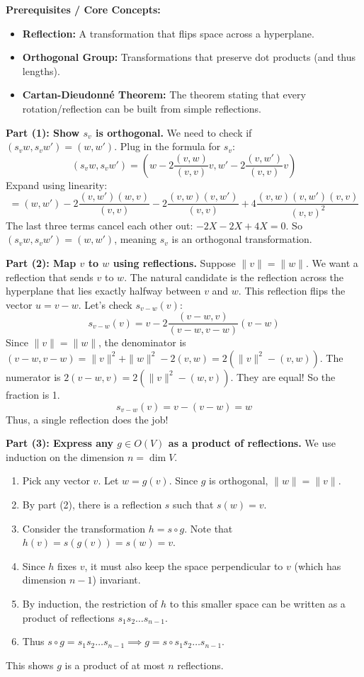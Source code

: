 \begin{solution}
\textbf{Prerequisites / Core Concepts:}
\begin{itemize}
    \item \textbf{Reflection:} A transformation that flips space across a hyperplane.
    \item \textbf{Orthogonal Group:} Transformations that preserve dot products (and thus lengths).
    \item \textbf{Cartan-Dieudonn\'e Theorem:} The theorem stating that every rotation/reflection can be built from simple reflections.
\end{itemize}

\textbf{Part (1): Show $s_v$ is orthogonal.}
We need to check if $(s_v w, s_v w') = (w, w')$.
Plug in the formula for $s_v$:
\[ (s_v w, s_v w') = \left( w - 2 \frac{(v,w)}{(v,v)}v, w' - 2 \frac{(v,w')}{(v,v)}v \right) \]
Expand using linearity:
\[ = (w, w') - 2\frac{(v,w')(w,v)}{(v,v)} - 2\frac{(v,w)(v,w')}{(v,v)} + 4\frac{(v,w)(v,w')(v,v)}{(v,v)^2} \]
The last three terms cancel each other out: $-2X - 2X + 4X = 0$.
So $(s_v w, s_v w') = (w, w')$, meaning $s_v$ is an orthogonal transformation.

\textbf{Part (2): Map $v$ to $w$ using reflections.}
Suppose $\|v\| = \|w\|$. We want a reflection that sends $v$ to $w$.
The natural candidate is the reflection across the hyperplane that lies exactly halfway between $v$ and $w$. This reflection flips the vector $u = v - w$.
Let's check $s_{v-w}(v)$:
\[ s_{v-w}(v) = v - 2 \frac{(v-w, v)}{(v-w, v-w)}(v-w) \]
Since $\|v\| = \|w\|$, the denominator is $(v-w, v-w) = \|v\|^2 + \|w\|^2 - 2(v,w) = 2(\|v\|^2 - (v,w))$.
The numerator is $2(v-w, v) = 2(\|v\|^2 - (w,v))$.
They are equal! So the fraction is 1.
\[ s_{v-w}(v) = v - (v-w) = w \]
Thus, a single reflection does the job!

\textbf{Part (3): Express any $g \in O(V)$ as a product of reflections.}
We use induction on the dimension $n = \dim V$.
\begin{enumerate}
    \item Pick any vector $v$. Let $w = g(v)$. Since $g$ is orthogonal, $\|w\| = \|v\|$.
    \item By part (2), there is a reflection $s$ such that $s(w) = v$.
    \item Consider the transformation $h = s \circ g$. Note that $h(v) = s(g(v)) = s(w) = v$.
    \item Since $h$ fixes $v$, it must also keep the space perpendicular to $v$ (which has dimension $n-1$) invariant.
    \item By induction, the restriction of $h$ to this smaller space can be written as a product of reflections $s_1 s_2 \dots s_{n-1}$.
    \item Thus $s \circ g = s_1 s_2 \dots s_{n-1} \implies g = s \circ s_1 s_2 \dots s_{n-1}$.
\end{enumerate}
This shows $g$ is a product of at most $n$ reflections.
\end{solution}

